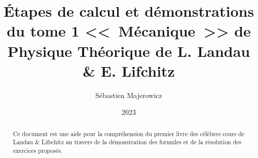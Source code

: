\documentclass[12pt,a4paper]{report}
\title{\'Etapes de calcul et d\'emonstrations du tome 1 <<~M\'ecanique~>>  de Physique Th\'eorique de L. Landau \&  E. Lifchitz}
\author{S\'ebastien Majerowicz}
\date{2023}
\begin{document}
\maketitle

\begin{abstract}
Ce document est une aide pour la compr\'ehension du premier livre des célèbres cours de Landau \& Lifschitz au travers de la démonstration des formules et de la résolution des exercices propos\'es.
\end{abstract}

\tableofcontents

\clearpage
{}
\setcounter{page}{1}



\end{document}
